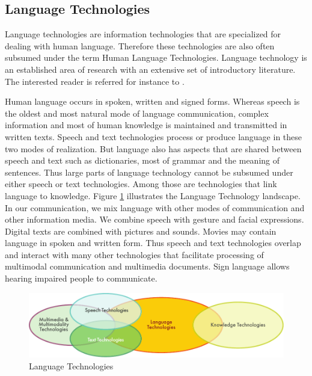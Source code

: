 \begin{multicols}{2}

\subsection{Language Technologies}
Language technologies are information technologies that are
specialized for dealing with human language. Therefore these
technologies are also often subsumed under the term Human Language
Technologies. Language technology is an established area of research with an extensive set of introductory literature. The interested reader is referred for instance to \cite{hltsurvey96} \cite{varile1997survey}.

Human language occurs in spoken, written and signed
forms. Whereas speech is the oldest and most natural mode of language
communication, complex information and most of human knowledge is
maintained and transmitted in written texts. Speech and text
technologies process or produce language in these two modes of
realization. But language also has aspects that are shared between
speech and text such as dictionaries, most of grammar and the meaning
of sentences. Thus large parts of language technology cannot be
subsumed under either speech or text technologies. Among those are
technologies that link language to knowledge. Figure \ref{fig:languagetechnoEng} 
illustrates the Language Technology landscape. In our communication,
we mix language with other modes of communication and other
information media. We combine speech with gesture and facial
expressions. Digital texts are combined with pictures and
sounds. Movies may contain language in spoken and written form. Thus
speech and text technologies overlap and interact with many other
technologies that facilitate processing of multimodal communication
and multimedia documents. Sign language allows hearing impaired people to communicate.

\begin{figure}[htb]
\begin{center}
 \includegraphics[width=\textwidth]{../_media/english/language_technologies} 
\caption{Language Technologies}
\label{fig:languagetechnoEng}
\end{center}
\end{figure}


\end{multicols}
